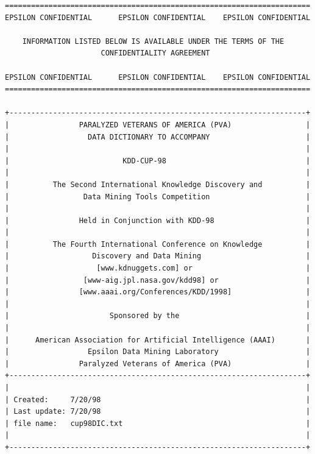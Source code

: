 \documentclass[
  11pt,
  a4paper,
  DIV=12,captions=tableheading,oneside]{scrbook}
\begin{document}
\begin{verbatim}
======================================================================
EPSILON CONFIDENTIAL      EPSILON CONFIDENTIAL    EPSILON CONFIDENTIAL

    INFORMATION LISTED BELOW IS AVAILABLE UNDER THE TERMS OF THE  
                      CONFIDENTIALITY AGREEMENT                

EPSILON CONFIDENTIAL      EPSILON CONFIDENTIAL    EPSILON CONFIDENTIAL
======================================================================

+--------------------------------------------------------------------+
|                PARALYZED VETERANS OF AMERICA (PVA)                 |
|                  DATA DICTIONARY TO ACCOMPANY                      |
|                                                                    |
|                          KDD-CUP-98                                |
|                                                                    |
|          The Second International Knowledge Discovery and          |
|                 Data Mining Tools Competition                      |
|                                                                    |
|                Held in Conjunction with KDD-98                     |
|                                                                    |
|          The Fourth International Conference on Knowledge          |
|                   Discovery and Data Mining                        |
|                    [www.kdnuggets.com] or                          |
|                 [www-aig.jpl.nasa.gov/kdd98] or                    |
|                [www.aaai.org/Conferences/KDD/1998]                 |
|                                                                    |
|                       Sponsored by the                             |
|                                                                    |
|      American Association for Artificial Intelligence (AAAI)       |
|                  Epsilon Data Mining Laboratory                    |
|                Paralyzed Veterans of America (PVA)                 |
+--------------------------------------------------------------------+
|                                                                    |
| Created:     7/20/98                                               |
| Last update: 7/20/98                                               |
| file name:   cup98DIC.txt                                          |
|                                                                    |
+--------------------------------------------------------------------+


\end{verbatim}
\end{document}

